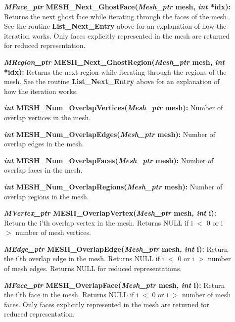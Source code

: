 \documentclass[12pt]{article}
\begin{document}
\begin{description}
  \item[]{\bf {\em MFace\_ptr} MESH\_Next\_GhostFace({\em Mesh\_ptr} mesh,
      {\em int} *idx):} Returns the next ghost face while iterating through the
    faces of the mesh. See the routine {\bf List\_Next\_Entry} above for
    an explanation of how the iteration works.  Only faces explicitly
    represented in the mesh are returned for reduced representation.

  \item[]{\bf {\em MRegion\_ptr}
      MESH\_Next\_GhostRegion({\em Mesh\_ptr} mesh, {\em int} *idx):}
    Returns the next region while iterating through the regions of the
    mesh. See the routine {\bf List\_Next\_Entry} above for an
    explanation of how the iteration works.
    
  \item[]

  \item[]{\bf {\em int} MESH\_Num\_OverlapVertices({\em Mesh\_ptr} mesh):}
    Number of overlap vertices in the mesh.

  \item[]{\bf {\em int} MESH\_Num\_OverlapEdges({\em Mesh\_ptr} mesh):}
    Number of overlap edges in the mesh.

  \item[]{\bf {\em int} MESH\_Num\_OverlapFaces({\em Mesh\_ptr} mesh):}
    Number of overlap faces in the mesh. 

  \item[]{\bf {\em int} MESH\_Num\_OverlapRegions({\em Mesh\_ptr} mesh):}
    Number of overlap regions in the mesh.

  \item[]

  \item[]{\bf {\em MVertex\_ptr} MESH\_OverlapVertex({\em Mesh\_ptr} mesh,
      {\em int} i):} Return the i'th overlap vertex in the mesh. Returns NULL if i
    $<$ 0 or i $>$ number of mesh vertices.

  \item[]{\bf {\em MEdge\_ptr} MESH\_OverlapEdge({\em Mesh\_ptr} mesh,
      {\em int} i):} Return the i'th overlap edge in the mesh. Returns NULL if i $<$
    0 or i $>$ number of mesh edges. Returns NULL for reduced
    representations.

  \item[]{\bf {\em MFace\_ptr} MESH\_OverlapFace({\em Mesh\_ptr} mesh,
      {\em int} i):} Return the i'th face in the mesh. Returns NULL if i $<$
    0 or i $>$ number of mesh faces. Only faces explicitly represented in
    the mesh are returned for reduced representation.


\end{description}
\end{document}

